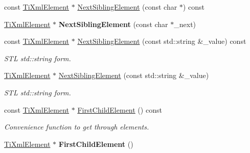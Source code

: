 \begin{DoxyCompactItemize}
\item 
const \hyperlink{class_ti_xml_element}{TiXmlElement} $\ast$ \hyperlink{class_ti_xml_node_a071ba77fd7ab79402fa84b7e9b8607b3}{NextSiblingElement} (const char $\ast$) const 
\item 
\hypertarget{class_ti_xml_node_a6e1ac6b800e18049bc75e9f8e63a8e5f}{
\hyperlink{class_ti_xml_element}{TiXmlElement} $\ast$ {\bfseries NextSiblingElement} (const char $\ast$\_\-next)}
\label{class_ti_xml_node_a6e1ac6b800e18049bc75e9f8e63a8e5f}

\item 
\hypertarget{class_ti_xml_node_a7572d0af9d1e696ee3f05d8bb5ebb463}{
const \hyperlink{class_ti_xml_element}{TiXmlElement} $\ast$ \hyperlink{class_ti_xml_node_a7572d0af9d1e696ee3f05d8bb5ebb463}{NextSiblingElement} (const std::string \&\_\-value) const }
\label{class_ti_xml_node_a7572d0af9d1e696ee3f05d8bb5ebb463}

\begin{DoxyCompactList}\small\item\em STL std::string form. \item\end{DoxyCompactList}\item 
\hypertarget{class_ti_xml_node_a506958e34406729a4e4c5326ea39d081}{
\hyperlink{class_ti_xml_element}{TiXmlElement} $\ast$ \hyperlink{class_ti_xml_node_a506958e34406729a4e4c5326ea39d081}{NextSiblingElement} (const std::string \&\_\-value)}
\label{class_ti_xml_node_a506958e34406729a4e4c5326ea39d081}

\begin{DoxyCompactList}\small\item\em STL std::string form. \item\end{DoxyCompactList}\item 
\hypertarget{class_ti_xml_node_af4fb652f6bd79ae0d5ce7d0f7d3c0fba}{
const \hyperlink{class_ti_xml_element}{TiXmlElement} $\ast$ \hyperlink{class_ti_xml_node_af4fb652f6bd79ae0d5ce7d0f7d3c0fba}{FirstChildElement} () const }
\label{class_ti_xml_node_af4fb652f6bd79ae0d5ce7d0f7d3c0fba}

\begin{DoxyCompactList}\small\item\em Convenience function to get through elements. \item\end{DoxyCompactList}\item 
\hypertarget{class_ti_xml_node_aa0fecff1f3866ab33a8a25506e95db1d}{
\hyperlink{class_ti_xml_element}{TiXmlElement} $\ast$ {\bfseries FirstChildElement} ()}
\label{class_ti_xml_node_aa0fecff1f3866ab33a8a25506e95db1d}


\end{DoxyCompactItemize}
